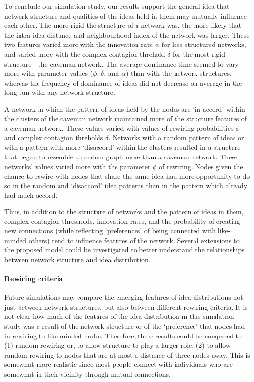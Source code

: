 
To conclude our simulation study, our results support the general idea that network structure and qualities of the ideas held in them may mutually influence each other. The more rigid the structure of a network was, the more likely that the intra-idea distance and neighbourhood index of the network was larger. These two features varied more with the innovation rate $\alpha$ for less structured networks, and varied more with the complex contagion threhold $\delta$ for the most rigid structure - the caveman network. The average dominance time seemed to vary more with parameter values ($\phi$, $\delta$, and $\alpha$) than with the network structures, whereas the frequency of dominance of ideas did not decrease on average in the long run with any network structure.

A network in which the pattern of ideas held by the nodes are `in accord' within the clusters of the caveman network maintained more of the structure features of a caveman network. These values varied with values of rewiring probabilities $\phi$ and complex contagion threholds $\delta$. Networks with a random pattern of ideas or with a pattern with more `disaccord' within the clusters resulted in a structure that began to resemble a random graph more than a caveman network. These networks' values varied more with the parameter $\phi$ of rewiring. Nodes given the chance to rewire with nodes that share the same idea had more opportunity to do so in the random and `disaccord' idea patterns than in the pattern which already had much accord.

Thus, in addition to the structure of networks and the pattern of ideas in them, complex contagion thresholds, innovation rates, and the probability of creating new connections (while reflecting `preferences' of being connected with like-minded others) tend to influence features of the network. Several extensions to the proposed model could be investigated to better understand the relationships between network structure and idea distribution.

\paragraph{Rewiring criteria}
Future simulations may compare the emerging features of idea distributions not just between network structures, but also between different rewiring criteria. It is not clear how much of the features of the idea distribution in this simulation study was a result of the network structure or of the `preference' that nodes had in rewiring to like-minded nodes. Therefore, these results could be compared to (1) random rewiring or, to allow structure to play a larger role, (2) to allow random rewiring to nodes that are at most a distance of three nodes away. This is somewhat more realistic since most people connect with individuals who are somewhat in their vicinity through mutual connections. 

